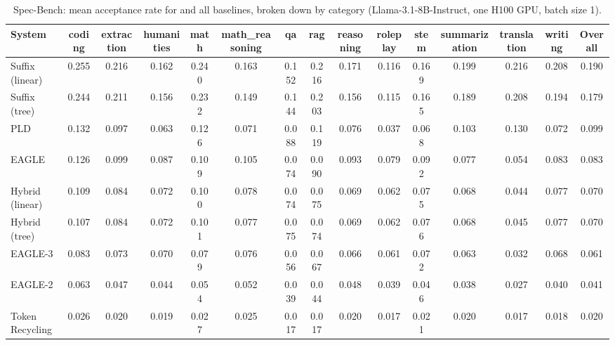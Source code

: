 \begin{table}[htbp]
\centering
\caption{Spec-Bench: mean acceptance rate for \SuffixDecoding and all baselines, broken down by category (Llama-3.1-8B-Instruct, one H100 GPU, batch size 1).}
\label{suffixdecoding:tab:spec-rate}
\small
\begin{adjustbox}{width=\linewidth}
\begin{tabular}{lcccccccccccccc}
\toprule
\textbf{System} & coding & extraction & humanities & math & math\_reasoning & qa & rag & reasoning & roleplay & stem & summarization & translation & writing & \textbf{Overall} \\
\midrule
Suffix (linear) & 0.255 & 0.216 & 0.162 & 0.240 & 0.163 & 0.152 & 0.216 & 0.171 & 0.116 & 0.169 & 0.199 & 0.216 & 0.208 & 0.190 \\
Suffix (tree) & 0.244 & 0.211 & 0.156 & 0.232 & 0.149 & 0.144 & 0.203 & 0.156 & 0.115 & 0.165 & 0.189 & 0.208 & 0.194 & 0.179 \\
PLD & 0.132 & 0.097 & 0.063 & 0.126 & 0.071 & 0.088 & 0.119 & 0.076 & 0.037 & 0.068 & 0.103 & 0.130 & 0.072 & 0.099 \\
EAGLE & 0.126 & 0.099 & 0.087 & 0.109 & 0.105 & 0.074 & 0.090 & 0.093 & 0.079 & 0.092 & 0.077 & 0.054 & 0.083 & 0.083 \\
Hybrid (linear) & 0.109 & 0.084 & 0.072 & 0.100 & 0.078 & 0.074 & 0.075 & 0.069 & 0.062 & 0.075 & 0.068 & 0.044 & 0.077 & 0.070 \\
Hybrid (tree) & 0.107 & 0.084 & 0.072 & 0.101 & 0.077 & 0.075 & 0.074 & 0.069 & 0.062 & 0.076 & 0.068 & 0.045 & 0.077 & 0.070 \\
EAGLE-3 & 0.083 & 0.073 & 0.070 & 0.079 & 0.076 & 0.056 & 0.067 & 0.066 & 0.061 & 0.072 & 0.063 & 0.032 & 0.068 & 0.061 \\
EAGLE-2 & 0.063 & 0.047 & 0.044 & 0.054 & 0.052 & 0.039 & 0.044 & 0.048 & 0.039 & 0.046 & 0.038 & 0.027 & 0.040 & 0.041 \\
Token Recycling & 0.026 & 0.020 & 0.019 & 0.027 & 0.025 & 0.017 & 0.017 & 0.020 & 0.017 & 0.021 & 0.020 & 0.017 & 0.018 & 0.020 \\
\bottomrule
\end{tabular}
\end{adjustbox}
\end{table}

